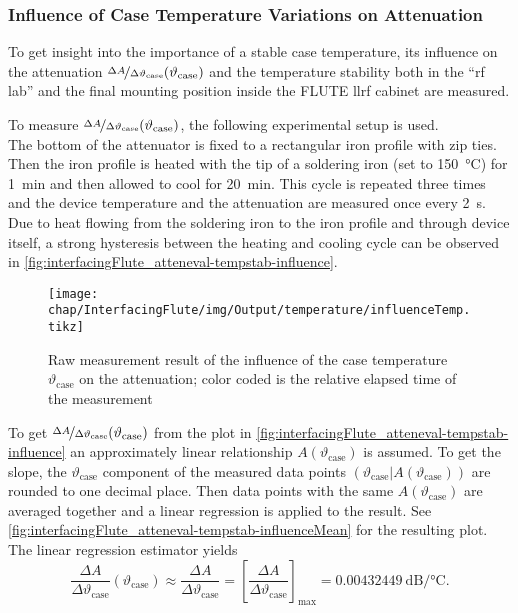 \subsubsection{Influence of Case Temperature Variations on Attenuation}
To get insight into the importance of a stable case temperature, its influence on the attenuation $\nicefrac{\Delta A}{\Delta \vartheta_\text{case}} (\vartheta_\text{case})$ and the temperature stability both in the ``\gls{rf} lab'' and the final mounting position inside the FLUTE \gls{llrf} cabinet are measured.

To measure $\nicefrac{\Delta A}{\Delta \vartheta_\text{case}} (\vartheta_\text{case})$, the following experimental setup is used.\\
The bottom of the attenuator is fixed to a rectangular iron profile with zip ties. Then the iron profile is heated with the tip of a soldering iron (set to \SI{150}{\degreeCelsius}) for \SI{1}{\minute} and then allowed to cool for \SI{20}{\minute}. This cycle is repeated three times and the device temperature and the attenuation are measured once every \SI{2}{\second}. Due to heat flowing from the soldering iron to the iron profile and through device itself, a strong hysteresis between the heating and cooling cycle can be observed in \autoref{fig:interfacingFlute_atteneval-tempstab-influence}.

\begin{figure}[tb]
	\centering
	\texttt{[image: chap/InterfacingFlute/img/Output/temperature/influenceTemp.tikz]}
	\caption[Influence of the case temperature on attenuation]{Raw measurement result of the influence of the case temperature $\vartheta_\text{case}$ on the attenuation; color coded is the relative elapsed time of the measurement}
	\label{fig:interfacingFlute_atteneval-tempstab-influence}
\end{figure}

To get $\nicefrac{\Delta A}{\Delta \vartheta_\text{case}} (\vartheta_\text{case})$ from the plot in \autoref{fig:interfacingFlute_atteneval-tempstab-influence} an approximately linear relationship $A(\vartheta_\text{case})$ is assumed. To get the slope, the $\vartheta_\text{case}$ component of the measured data points $(\vartheta_\text{case}|A(\vartheta_\text{case}))$ are rounded to one decimal place. Then data points with the same $A(\vartheta_\text{case})$ are averaged together and a linear regression is applied to the result. See \autoref{fig:interfacingFlute_atteneval-tempstab-influenceMean} for the resulting plot. The linear regression estimator yields
\begin{equation}
\frac{\Delta A}{\Delta \vartheta_\text{case}} (\vartheta_\text{case})
\approx \frac{\Delta A}{\Delta \vartheta_\text{case}}
= \left[\frac{\Delta A}{\Delta \vartheta_\text{case}}\right]_\text{max}
= \SI{0.00432449}{\dB\per\celsius}.
\end{equation}

